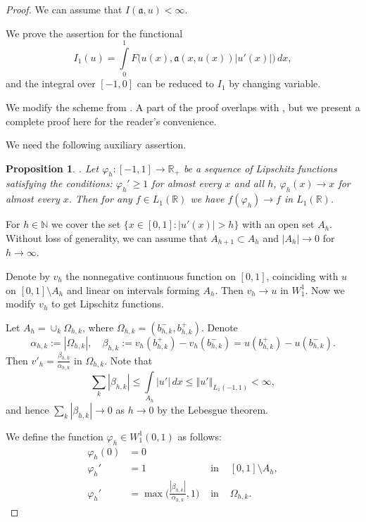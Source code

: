 \documentclass[12pt]{article}
\newcommand{\Real}{\mathbb R}
\newcommand{\Nat}{\mathbb N}
\newcommand{\norm}[1]{\left\Vert#1\right\Vert}
\newcommand{\abs}[1]{\left\vert#1\right\vert}
\renewcommand{\phi}{\varphi}
\renewcommand{\ge}{\geqslant}
\renewcommand{\le}{\leqslant}
\newtheorem{prop}{Proposition}
\newcommand{\W}{W_1^1}
\begin{document}
\begin{proof}
We can assume that $I( \mathfrak a, u ) < \infty$.

We prove the assertion for the functional
$$I_1( u ) = \int\limits_0^1 F\big( u(x), \mathfrak a(x, u(x)) |u'(x)| \big) \, dx,$$
and the integral over $[-1, 0]$ can be reduced to $I_1$ by changing variable.

We modify the scheme from \cite[Theorem 2.4]{ASC}.
A part of the proof overlaps with \cite{ASC}, but we present a complete proof here for the reader's convenience.

We need the following auxiliary assertion.

\begin{prop}
\label{convToOne}
{\rm \cite[Lemma 2.7]{ASC}.}
Let $\phi_h: [-1, 1] \to \Real_+$ be a sequence of Lipschitz functions satisfying the conditions:
$\phi_h' \ge 1$ for almost every $x$ and all $h$, $\phi_h( x ) \to x$ for almost every $x$.
Then for any $f \in L_1(\Real)$ we have $f(\phi_h) \to f$ in $L_1(\Real)$.
\end{prop}

For $h \in \Nat$ we cover the set $\{ x \in [0, 1]: |u'(x)| > h \}$ with an open set $A_h$.
Without loss of generality, we can assume that
$A_{h + 1} \subset A_{h}$ and $\abs{A_h} \to 0$ for $h \to \infty$.

Denote by $v_h$ the nonnegative continuous function on $[0, 1]$,
coinciding with $u$ on $[0, 1] \setminus A_h$ and
linear on intervals forming $A_h$.
Then $v_h \to u$ in $\W$.
Now we modify $v_h$ to get Lipschitz functions.

Let $A_h = \cup_k \Omega_{h,k}$, where $\Omega_{h,k} = ( b_{h,k}^-, b_{h,k}^+ )$.
Denote
$$\alpha_{h,k} := \abs{\Omega_{h,k}}, \quad
\beta_{h,k} := v_h(b_{h,k}^+) - v_h(b_{h,k}^-) = u(b_{h,k}^+) - u(b_{h,k}^-).$$
Then $v'_h = \frac{\beta_{h,k}}{\alpha_{h,k}}$ in $\Omega_{h,k}$.
Note that
$$\sum_k \abs{\beta_{h,k}} \le \int\limits_{A_h} \abs{u'} \, dx \le \norm{u'}_{L_1(-1, 1)}< \infty,$$
and hence
$\sum_k \abs{\beta_{h,k}} \to 0$ as $h \to 0$ by the Lebesgue theorem.

We define the function $\phi_h \in \W(0, 1)$ as follows:
$$
\begin{aligned}
\phi_h( 0 ) &= 0 & & \\
\phi_h' &=  1 & \text{ in } & [0, 1] \setminus A_h,\\
\phi_h' &=  \max \Big( \frac{ \abs{\beta_{h,k}} }{ \alpha_{h,k} }, 1 \Big) & \text{ in } & \Omega_{h,k}.
\end{aligned}
$$	


\end{proof}
\end{document}
